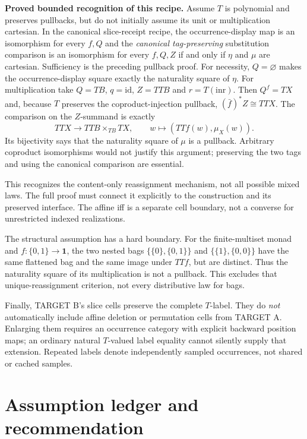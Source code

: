 \documentclass[11pt,a4paper]{article}
\newcommand{\id}{\mathrm{id}}
\newcommand{\one}{\mathbf 1}
\newcommand{\status}[1]{\textbf{#1.}}
\begin{document}
\status{Proved bounded recognition of this recipe}
Assume $T$ is polynomial and preserves pullbacks, but do not initially assume
its unit or multiplication cartesian. In the canonical slice-receipt recipe,
the occurrence-display map is an isomorphism for every $f,Q$ and the
\emph{canonical tag-preserving} substitution comparison is an isomorphism
for every $f,Q,Z$ if and only if $\eta$ and $\mu$ are cartesian.
Sufficiency is the preceding pullback proof. For necessity, $Q=\varnothing$
makes the occurrence-display square exactly the naturality square of $\eta$.
For multiplication take $Q=TB$, $q=\id$, $Z=TTB$ and $r=T(\mathrm{inr})$.
Then $Q^f=TX$ and, because $T$ preserves the coproduct-injection pullback,
$(\bar f)^*Z\cong TTX$. The comparison on the $Z$-summand is exactly
\[
 TTX\longrightarrow TTB\times_{TB}TX,\qquad
 w\longmapsto(TTf(w),\mu_X(w)).
\]
Its bijectivity says that the naturality square of $\mu$ is a pullback.
Arbitrary coproduct isomorphisms would not justify this argument; preserving
the two tags and using the canonical comparison are essential.

This recognizes the content-only reassignment mechanism, not all possible
mixed laws. The full proof must connect it explicitly to the construction
and its preserved interface. The affine iff is a separate cell boundary,
not a converse for unrestricted indexed realizations.

The structural assumption has a hard boundary. For the finite-multiset
monad and $f:\{0,1\}\to\one$, the two nested bags
$\{\{0\},\{0,1\}\}$ and $\{\{1\},\{0,0\}\}$ have the same flattened
bag and the same image under $TTf$, but are distinct. Thus the naturality
square of its multiplication is not a pullback. This excludes that
unique-reassignment criterion, not every distributive law for bags.

Finally, TARGET B's slice cells preserve the complete $T$-label. They do
\emph{not} automatically include affine deletion or permutation cells from
TARGET A. Enlarging them requires an occurrence category with explicit
backward position maps; an ordinary natural $T$-valued label equality cannot
silently supply that extension. Repeated labels denote independently sampled
occurrences, not shared or cached samples.

\section{Assumption ledger and recommendation}
\end{document}
